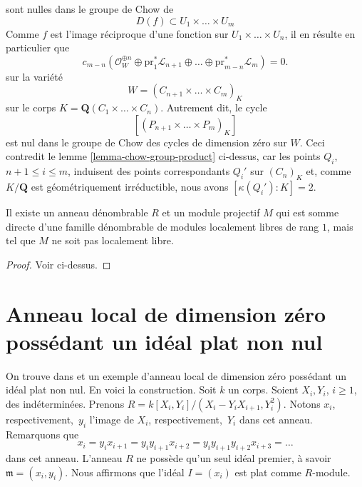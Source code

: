 sont nulles dans le groupe de Chow de
$$
D(f) \subset U_1 \times \ldots \times U_m
$$
Comme $f$ est l'image réciproque d'une fonction sur $U_1 \times \ldots \times U_n$,
il en résulte en particulier que
$$
c_{m - n}(\mathcal{O}_W^{\oplus n} \oplus
\text{pr}_1^*\mathcal{L}_{n + 1} \oplus \ldots
\oplus \text{pr}_{m - n}^*\mathcal{L}_m) = 0.
$$
sur la variété
$$
W = (C_{n + 1} \times \ldots \times C_m)_K
$$
sur le corps $K = \mathbf{Q}(C_1 \times \ldots \times C_n)$.
Autrement dit, le cycle
$$
[(P_{n + 1} \times \ldots \times P_m)_K]
$$
est nul dans le groupe de Chow des cycles de dimension zéro sur $W$. Ceci contredit le
lemme \ref{lemma-chow-group-product}
ci-dessus, car les points $Q_i$, $n + 1 \leq i \leq m$,
induisent des points correspondants $Q_i'$ sur $(C_n)_K$ et, comme $K/\mathbf{Q}$
est géométriquement irréductible, nous avons $[\kappa(Q_i') : K] = 2$.

\begin{lemma}
\label{lemma-projective-not-locally-free}
Il existe un anneau dénombrable $R$ et un module projectif $M$
qui est somme directe d'une famille dénombrable de modules localement libres de rang $1$,
mais tel que $M$ ne soit pas localement libre.
\end{lemma}

\begin{proof}
Voir ci-dessus.
\end{proof}







\section{Anneau local de dimension zéro possédant un idéal plat non nul}
\label{section-zero-dimensional-flat-ideal}

\noindent
On trouve dans \cite{Lazard} et \cite{Autour}
un exemple d'anneau local de dimension zéro possédant un
idéal plat non nul. En voici la construction. Soit $k$ un corps.
Soient $X_i, Y_i$, $i \geq 1$, des indéterminées. Prenons
$R = k[X_i, Y_i]/(X_i - Y_i X_{i + 1}, Y_i^2)$. Notons $x_i$, respectivement,\ $y_i$
l'image de $X_i$, respectivement,\ $Y_i$ dans cet anneau. Remarquons que
$$
x_i = y_i x_{i + 1} = y_i y_{i +1} x_{i + 2} =
y_i y_{i + 1} y_{i + 2} x_{i + 3} = \ldots
$$
dans cet anneau. L'anneau $R$ ne possède qu'un
seul idéal premier, à savoir $\mathfrak m = (x_i, y_i)$. Nous affirmons que
l'idéal $I = (x_i)$ est plat comme $R$-module.

